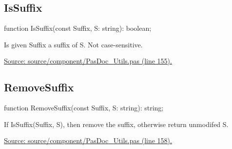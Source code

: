 \documentclass{report}
\newif\ifpdf
\begin{document}
\subsection*{IsSuffix}
\fi
\label{PasDoc_Utils-IsSuffix}
\begin{list}{}{
\setlength{\itemindent}{0cm}
\setlength{\listparindent}{0cm}
\setlength{\leftmargin}{\evensidemargin}
\addtolength{\leftmargin}{\tmplength}
\settowidth{\labelsep}{X}
\addtolength{\leftmargin}{\labelsep}
\setlength{\labelwidth}{\tmplength}
}
\item[\textbf{Declaration}\hfill]
\ifpdf
\begin{flushleft}
\fi
\begin{ttfamily}
function IsSuffix(const Suffix, S: string): boolean;\end{ttfamily}

\ifpdf
\end{flushleft}
\fi

\par
\item[\textbf{Description}]
Is given Suffix a suffix of S. Not case{-}sensitive.\par
\href{https://github.com/pasdoc/pasdoc/blob/master/source/component/PasDoc_Utils.pas#L155}{Source: source/component/PasDoc{\_}Utils.pas (line 155).}

\end{list}
\ifpdf
\subsection*{\large{\textbf{RemoveSuffix}}\normalsize\hspace{1ex}\hrulefill}
\else
\subsection*{RemoveSuffix}
\fi
\label{PasDoc_Utils-RemoveSuffix}
\begin{list}{}{
\setlength{\itemindent}{0cm}
\setlength{\listparindent}{0cm}
\setlength{\leftmargin}{\evensidemargin}
\addtolength{\leftmargin}{\tmplength}
\settowidth{\labelsep}{X}
\addtolength{\leftmargin}{\labelsep}
\setlength{\labelwidth}{\tmplength}
}
\item[\textbf{Declaration}\hfill]
\ifpdf
\begin{flushleft}
\fi
\begin{ttfamily}
function RemoveSuffix(const Suffix, S: string): string;\end{ttfamily}

\ifpdf
\end{flushleft}
\fi

\par
\item[\textbf{Description}]
If IsSuffix(Suffix, S), then remove the suffix, otherwise return unmodifed S.\par
\href{https://github.com/pasdoc/pasdoc/blob/master/source/component/PasDoc_Utils.pas#L158}{Source: source/component/PasDoc{\_}Utils.pas (line 158).}

\end{list}
\ifpdf
\end{document}
